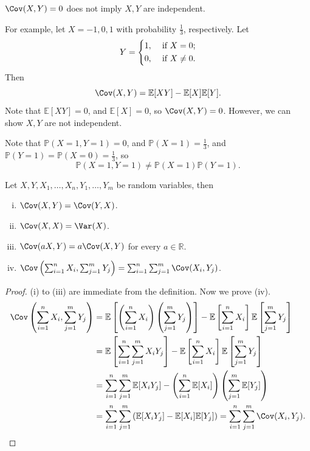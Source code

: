 \begin{remark}
    \(\Cov(X, Y) = 0\) does not imply \(X, Y\) are independent.

    For example, let \(X = -1, 0, 1\) with probability \(\frac{1}{3}\), respectively. Let 
    \[
        Y = \begin{dcases}
            1, &\text{ if } X = 0;\\
            0, &\text{ if } X \neq 0.
        \end{dcases}
    \]    
    Then 
    \[
        \Cov(X, Y) = \mathbb{E} [X Y] - \mathbb{E} [X] \mathbb{E} [Y].
    \]
    Note that \(\mathbb{E} [X Y] = 0\), and \(\mathbb{E} [X] = 0\), so \(\Cov(X, Y) = 0\). However, we can show \(X, Y\) are not independent. 

    Note that \(\mathbb{P} (X = 1, Y = 1) = 0\), and \(\mathbb{P} (X = 1) = \frac{1}{3}\), and \(\mathbb{P} (Y = 1) = \mathbb{P} (X = 0) = \frac{1}{3}\), so 
    \[
        \mathbb{P} (X = 1, Y = 1) \neq \mathbb{P} (X = 1) \mathbb{P} (Y = 1). 
    \]      
\end{remark}

\begin{proposition}
    Let \(X, Y, X_1, \dots, X_n, Y_1, \dots, Y_m\) be random variables, then 
    \begin{enumerate}[(i)]
        \item \(\Cov(X, Y) = \Cov(Y, X)\). 
        \item \(\Cov(X, X) = \Var(X)\). 
        \item \(\Cov(aX, Y) = a \Cov(X, Y)\) for every \(a \in \mathbb{R}\). 
        \item \(\Cov \left( \sum_{i=1}^n X_i , \sum_{j=1}^m Y_j   \right) = \sum_{i=1}^n \sum_{j=1}^m \Cov(X_i, Y_j)   \).      
    \end{enumerate} 
\end{proposition}

\begin{proof}
    (i) to (iii) are immediate from the definition. Now we prove (iv). 
    \begin{align*}
        \Cov \left( \sum_{i=1}^n X_i, \sum_{j=1}^m Y_j   \right) &= \mathbb{E} \left[ \left( \sum_{i=1}^n X_i  \right) \left( \sum_{j=1}^m Y_j  \right)   \right] - \mathbb{E} \left[ \sum_{i=1}^n X_i  \right] \mathbb{E} \left[ \sum_{j=1}^m Y_j  \right] \\
        &= \mathbb{E} \left[ \sum_{i=1}^n \sum_{j=1}^m X_i Y_j   \right] - \mathbb{E} \left[ \sum_{i=1}^n X_i  \right] \mathbb{E} \left[ \sum_{j=1}^m Y_j  \right] \\
        &= \sum_{i=1}^n \sum_{j=1}^m \mathbb{E} [X_i Y_j] - \left( \sum_{i=1}^n \mathbb{E} [X_i]  \right) \left( \sum_{j=1}^m \mathbb{E} [Y_j]  \right) \\
        &= \sum_{i=1}^n \sum_{j=1}^m \left( \mathbb{E} [X_i Y_j] - \mathbb{E} [X_i] \mathbb{E} [Y_j] \right) = \sum_{i=1}^n \sum_{j=1}^m \Cov(X_i, Y_j).         
    \end{align*}
\end{proof}

